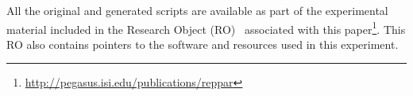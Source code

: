All the original and generated scripts are available as part of the experimental material included in the Research Object (RO)~\cite{researchObjects} associated with this paper\footnote{\url{http://pegasus.isi.edu/publications/reppar}}. This RO also contains pointers to the software and resources used in this experiment.